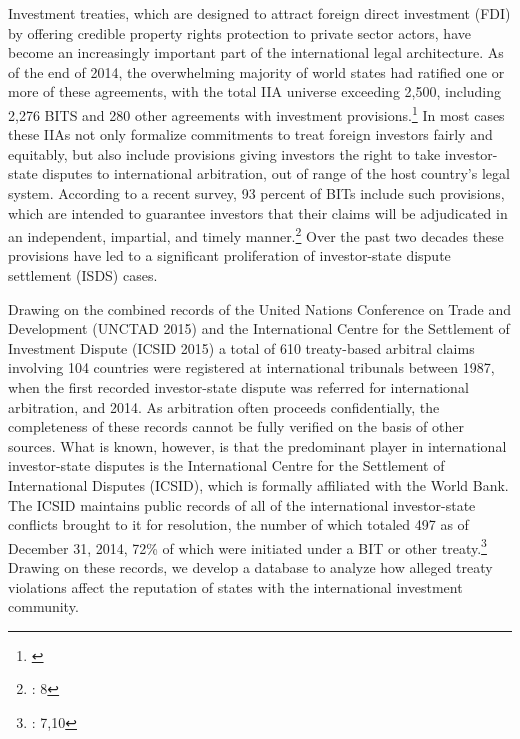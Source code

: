 \documentclass[12pt,onesided]{amsart}
\begin{document}

Investment treaties, which are designed to attract foreign direct investment (FDI) by offering credible property rights protection to private sector actors, have become an increasingly important part of the international legal architecture. As of the end of 2014, the overwhelming majority of world states had ratified one or more of these agreements, with the total IIA universe exceeding 2,500, including 2,276 BITS and 280 other agreements with investment provisions.\footnote{\citet{unctad:2015}} In most cases these IIAs not only formalize commitments to treat foreign investors fairly and equitably, but also include provisions giving investors the right to take investor-state disputes to international arbitration, out of range of the host country's legal system. According to a recent survey, 93 percent of BITs include such provisions, which are intended to guarantee investors that their claims will be adjudicated in an independent, impartial, and timely manner.\footnote{\citet{gaukordger:gordon:2012}: 8} Over the past two decades these provisions have led to a significant proliferation of investor-state dispute settlement (ISDS) cases.


Drawing on the combined records of the United Nations Conference on Trade and Development (UNCTAD 2015) and the International Centre for the Settlement of Investment Dispute (ICSID 2015) a total of 610 treaty-based arbitral claims involving 104 countries were registered at international tribunals between 1987, when the first recorded investor-state dispute was referred for international arbitration, and 2014. As arbitration often proceeds confidentially, the completeness of these records cannot be fully verified on the basis of other sources. What is known, however, is that the predominant player in international investor-state disputes is the International Centre for the Settlement of International Disputes (ICSID), which is formally affiliated with the World Bank. The ICSID maintains public records of all of the international investor-state conflicts brought to it for resolution, the number of which totaled 497 as of December 31, 2014, 72\% of which were initiated under a BIT or other treaty.\footnote{\citet{icsid:2015}: 7,10} Drawing on these records, we develop a database to analyze how alleged treaty violations affect the reputation of states with the international investment community. 
\end{document}
